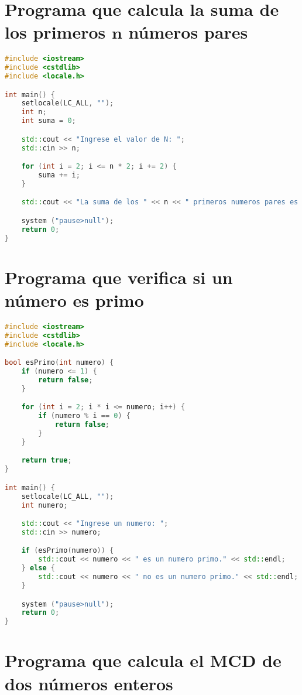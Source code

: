 \section*{Programa que calcula la suma de los primeros $\bm{n}$ números pares}

\noindent
\begin{lstlisting}[language=C++]
#include <iostream>
#include <cstdlib>
#include <locale.h>

int main() {
    setlocale(LC_ALL, "");
    int n;
    int suma = 0;

    std::cout << "Ingrese el valor de N: ";
    std::cin >> n;

    for (int i = 2; i <= n * 2; i += 2) {
        suma += i;
    }

    std::cout << "La suma de los " << n << " primeros numeros pares es: " << suma << std::endl;

	system ("pause>null");
	return 0;
}

\end{lstlisting}

\section*{Programa que verifica si un número es primo}

\noindent
\begin{lstlisting}[language=C++]
#include <iostream>
#include <cstdlib>
#include <locale.h>

bool esPrimo(int numero) {
    if (numero <= 1) {
        return false;
    }

    for (int i = 2; i * i <= numero; i++) {
        if (numero % i == 0) {
            return false;
        }
    }

    return true;
}

int main() {
    setlocale(LC_ALL, "");
    int numero;

    std::cout << "Ingrese un numero: ";
    std::cin >> numero;

    if (esPrimo(numero)) {
        std::cout << numero << " es un numero primo." << std::endl;
    } else {
        std::cout << numero << " no es un numero primo." << std::endl;
    }

	system ("pause>null");
	return 0;
}

\end{lstlisting}

\section*{Programa que calcula el MCD de dos números enteros}

